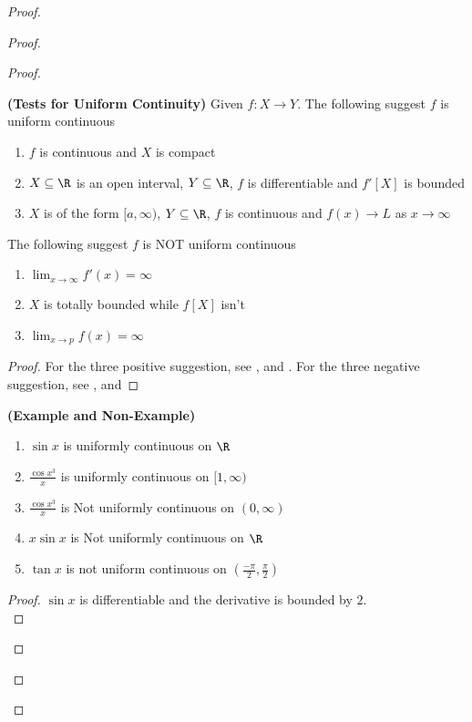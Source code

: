 \documentclass{report}
\begin{document}
\begin{proof}
\begin{proof}
\begin{proof}
\begin{theorem}
\label{5.4.7}
\textbf{(Tests for Uniform Continuity)} Given $f:X\rightarrow Y$. The following suggest $f$ is uniform continuous 
\begin{enumerate}[label=(\alph*)]
  \item $f$ is continuous and $X$ is compact 
  \item $X\subseteq \R$ is an open interval, $Y\subseteq \R$, $f$ is differentiable and $f'[X]$ is bounded 
  \item $X$ is of the form  $[a,\infty)$, $Y\subseteq \R$, $f$ is continuous and  $f(x)\to L$ as $x\to \infty$ 
\end{enumerate}
The following suggest $f$ is NOT uniform continuous
\begin{enumerate}[label=(\alph*)]
  \item $\lim_{x\to \infty}f'(x)=\infty$
  \item $X$ is totally bounded while $f[X]$ isn't 
  \item $\lim_{x\to p}f(x)=\infty$
\end{enumerate}
\end{theorem}
\begin{proof}
For the three positive suggestion, see ,  and . For the three negative suggestion, see ,  and 
\end{proof}
\begin{theorem}
\label{5.4.8}
\textbf{(Example and Non-Example)}
\begin{enumerate}[label=(\alph*)]
  \item $\sin x$ is uniformly continuous on $\R$ 
  \item $\frac{\cos x^3}{x}$ is uniformly continuous on $[1,\infty)$
  \item $\frac{\cos x^3}{x}$ is Not uniformly continuous on $(0,\infty)$
  \item $x \sin x$ is Not uniformly continuous on $\R$ 
  \item $\tan x$ is not uniform continuous on  $(\frac{-\pi}{2},\frac{\pi}{2})$
\end{enumerate}
\end{theorem}
\begin{proof}
$\sin x$ is differentiable and the derivative is bounded by $2$.\\


\end{proof}
\end{proof}
\end{proof}
\end{proof}
\end{document}
